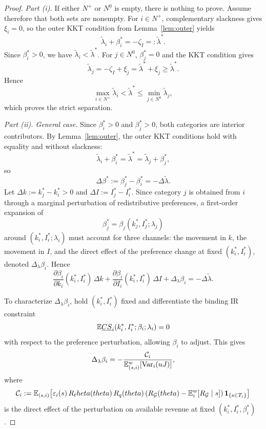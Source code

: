 \documentclass[master.tex]{subfiles}
\begin{document}
\begin{proof}

\noindent\textit{Part (i).} If either $N^+$ or $N^0$ is empty, there is nothing to prove. Assume therefore that both sets are nonempty. For $i\in N^+$, complementary slackness gives $\xi_i=0$, so the outer KKT condition from Lemma~\ref{lem:outer} yields
\[
\tilde\lambda_i+\beta_i^\ast=-\zeta_I=:\tilde\lambda^\ast.
\]
Since $\beta_i^\ast>0$, we have $\tilde\lambda_i<\tilde\lambda^\ast$. For $j\in N^0$, $\beta_j^\ast=0$ and the KKT condition gives
\[
\tilde\lambda_j=-\zeta_I+\xi_j=\tilde\lambda^\ast+\xi_j\ge \tilde\lambda^\ast.
\]
Hence
\[
\max_{i\in N^+}\tilde\lambda_i<\tilde\lambda^\ast\le \min_{j\in N^0}\tilde\lambda_j,
\]
which proves the strict separation.

\noindent\textit{Part (ii). General case.} Since $\beta_i^\ast>0$ and $\beta_j^\ast>0$, both categories are interior contributors. By Lemma~\ref{lem:outer}, the outer KKT conditions hold with equality and without slackness:
\[
\tilde\lambda_i+\beta_i^\ast = \tilde\lambda^\ast = \tilde\lambda_j+\beta_j^\ast,
\]
so
\[
\Delta\beta^\ast:=\beta_j^\ast-\beta_i^\ast=-\Delta\tilde\lambda.
\]
Let $\Delta k:=k_j^\ast-k_i^\ast>0$ and $\Delta I:=I_j^\ast-I_i^\ast$. Since category $j$ is obtained from $i$ through a marginal perturbation of redistributive preferences, a first-order expansion of
\[
\beta_j^\ast=\beta_j(k_j^\ast,I_j^\ast;\lambda_j)
\]
around $(k_i^\ast,I_i^\ast;\lambda_i)$ must account for three channels: the movement in $k$, the movement in $I$, and the direct effect of the preference change at fixed $(k_i^\ast,I_i^\ast)$, denoted $\Delta_\lambda\beta_i$. Hence
\[
\frac{\partial \beta_i}{\partial k_i}(k_i^\ast,I_i^\ast)\,\Delta k
+
\frac{\partial \beta_i}{\partial I_i}(k_i^\ast,I_i^\ast)\,\Delta I
+
\Delta_\lambda\beta_i
=
-\Delta\tilde\lambda.
\]

To characterize $\Delta_\lambda\beta_i$, hold $(k_i^\ast,I_i^\ast)$ fixed and differentiate the binding IR constraint
\[
\mathbb{E}\underline{CS}_i(k_i^\ast,I_i^\ast;\beta_i;\lambda_i)=0
\]
with respect to the preference perturbation, allowing $\beta_i$ to adjust. This gives
\[
\Delta_\lambda\beta_i
=
-\frac{\mathcal C_i}{\mathbb{E}_{(s,i)}^w[\mathrm{Var}_i(uJ)]},
\]
where
\[
\mathcal C_i
:=
\mathbb{E}_{(s,i)}\!\left[
\varepsilon_i(s)\,R_theta(theta)\,R_q(theta)
\left(
R_{\mathcal G}(theta)-\mathbb{E}_i^w[R_{\mathcal G}\mid s]
\right)
\mathbf 1_{\{s\in T_i\}}
\right]
\]
is the direct effect of the perturbation on available revenue at fixed $(k_i^\ast,I_i^\ast,\beta_i^\ast)$.


\end{proof}
\end{document}
